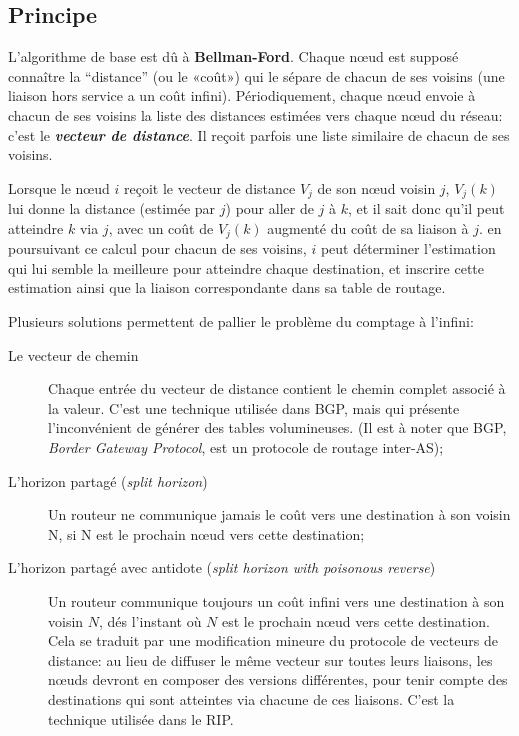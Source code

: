 \documentclass[11pt,english,french]{scrreprt}
\theoremstyle{remark}
\theoremstyle{definition}
\begin{document}
\subsection{Principe} %

L'algorithme de base est dû à \textbf{Bellman-Ford}. Chaque nœud est supposé connaître la ``distance'' (ou le «coût») qui le sépare de chacun de ses voisins (une liaison hors service a un coût infini). Périodiquement, chaque nœud envoie à chacun de ses voisins la liste des distances estimées vers chaque nœud du réseau: c'est le \emph{\textbf{vecteur de distance}}. Il reçoit parfois une liste similaire de chacun de ses voisins.
\newline

Lorsque le nœud $i$ reçoit le vecteur de distance $V_j$ de son nœud voisin $j$, $V_j(k)$ lui donne la distance (estimée par $j$) pour aller de $j$ à $k$, et il sait donc qu'il peut atteindre $k$ via $j$, avec un coût de $V_j(k)$ augmenté du coût de sa liaison à $j$. en poursuivant ce calcul pour chacun de ses voisins, $i$ peut déterminer l'estimation qui lui semble la meilleure pour atteindre chaque destination, et inscrire cette estimation ainsi que la liaison correspondante dans sa table de routage.
\newline

Plusieurs solutions permettent de pallier le problème du comptage à l'infini:\begin{description}
	\item[Le vecteur de chemin] Chaque entrée du vecteur de distance contient le chemin complet associé à la valeur. C'est une technique utilisée dans BGP, mais qui présente l'inconvénient de générer des tables volumineuses. (Il est à noter que BGP, \emph{Border Gateway Protocol}, est un protocole de routage inter-AS);
	\item[L'horizon partagé (\emph{split horizon})] Un routeur ne communique jamais le coût vers une destination à son voisin N, si N est le prochain nœud vers cette destination;
	\item[L'horizon partagé avec antidote (\emph{split horizon with poisonous reverse})] Un routeur communique toujours un coût infini vers une destination à son voisin $N$, dés l'instant où $N$ est le prochain nœud vers cette destination. Cela se traduit par une modification mineure du protocole de vecteurs de distance: au lieu de diffuser le même vecteur sur toutes leurs liaisons, les nœuds devront en composer des versions différentes, pour tenir compte des destinations qui sont atteintes via chacune de ces liaisons. C'est la technique utilisée dans le RIP.
\end{description}
\end{document}
